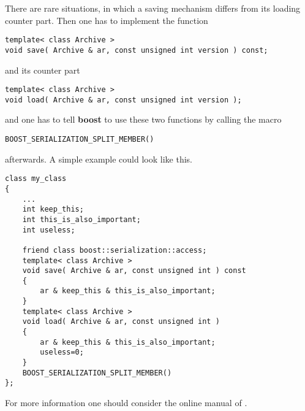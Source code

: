 There are rare situations, in which a saving mechanism differs from its loading counter part.
Then one has to implement the function
\begin{lstlisting}
template< class Archive >
void save( Archive & ar, const unsigned int version ) const;
\end{lstlisting}
and its counter part
\begin{lstlisting}
template< class Archive >
void load( Archive & ar, const unsigned int version );
\end{lstlisting}
and one has to tell {\bf boost} to use these two functions by calling the macro
\begin{lstlisting}
BOOST_SERIALIZATION_SPLIT_MEMBER()
\end{lstlisting}
afterwards. A simple example could look like this.
\begin{lstlisting}
class my_class
{
    ...
    int keep_this;
    int this_is_also_important;
    int useless;
    
    friend class boost::serialization::access;
    template< class Archive >
    void save( Archive & ar, const unsigned int ) const
    {
        ar & keep_this & this_is_also_important;
    }
    template< class Archive >
    void load( Archive & ar, const unsigned int )
    {
        ar & keep_this & this_is_also_important;
        useless=0;
    }
    BOOST_SERIALIZATION_SPLIT_MEMBER()
};
\end{lstlisting}
For more information one should consider the online manual of \cite{boost}.
